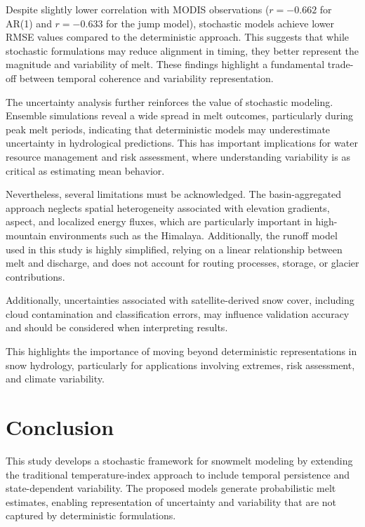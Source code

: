 \documentclass[11pt]{article}
\begin{document}
	Despite slightly lower correlation with MODIS observations ($r = -0.662$ for AR(1) and $r = -0.633$ for the jump model), stochastic models achieve lower RMSE values compared to the deterministic approach. This suggests that while stochastic formulations may reduce alignment in timing, they better represent the magnitude and variability of melt. These findings highlight a fundamental trade-off between temporal coherence and variability representation.
	
	The uncertainty analysis further reinforces the value of stochastic modeling. Ensemble simulations reveal a wide spread in melt outcomes, particularly during peak melt periods, indicating that deterministic models may underestimate uncertainty in hydrological predictions. This has important implications for water resource management and risk assessment, where understanding variability is as critical as estimating mean behavior.
	
	Nevertheless, several limitations must be acknowledged. The basin-aggregated approach neglects spatial heterogeneity associated with elevation gradients, aspect, and localized energy fluxes, which are particularly important in high-mountain environments such as the Himalaya. Additionally, the runoff model used in this study is highly simplified, relying on a linear relationship between melt and discharge, and does not account for routing processes, storage, or glacier contributions.
			
	Additionally, uncertainties associated with satellite-derived snow cover, including cloud contamination and classification errors, may influence validation accuracy and should be considered when interpreting results.
	
	
	This highlights the importance of moving beyond deterministic representations in snow hydrology, particularly for applications involving extremes, risk assessment, and climate variability.
	
\section{Conclusion}

This study develops a stochastic framework for snowmelt modeling by extending the traditional temperature-index approach to include temporal persistence and state-dependent variability. The proposed models generate probabilistic melt estimates, enabling representation of uncertainty and variability that are not captured by deterministic formulations.
\end{document}
